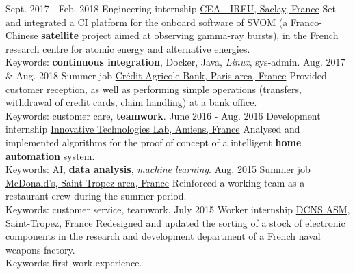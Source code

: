\documentclass[a4paper]{twentysecondcv} %
\begin{document}
\begin{twenty} %
    \twentyitem
    	{Sept. 2017 -}
		{Feb. 2018}
        {Engineering internship}
        {\href{http://irfu.cea.fr/}{CEA - IRFU, Saclay, France}}
        {}
        {Set and integrated a CI platform for the onboard software of SVOM (a Franco-Chinese \textbf{satellite} project aimed at observing gamma-ray bursts), in the French research centre for atomic energy and alternative energies.\\Keywords: \textbf{continuous integration}, Docker, Java, \textit{Linux}, sys-admin.}
    \twentyitem
        {Aug. 2017 \&}
                {Aug. 2018}
        {Summer job}
        {\href{https://ca-paris.com/}{Crédit Agricole Bank, Paris area, France}}
        {}
        {Provided customer reception, as well as performing simple operations (transfers, withdrawal of credit cards, claim handling) at a bank office.\\Keywords: customer care, \textbf{teamwork}.}
	\twentyitem
    	{June 2016 -}
		{Aug. 2016}
        {Development internship}
        {\href{http://lti-picardie.fr/}{Innovative Technologies Lab, Amiens, France}}
        {}
        {Analysed and implemented algorithms for the proof of concept of a intelligent \textbf{home automation} system.\\Keywords: AI, \textbf{data analysis}, \textit{machine learning}.}
    \twentyitem
   		{Aug. 2015}
        {}
        {Summer job}
        {\href{https://www.restaurants.mcdonalds.fr/mcdonalds-gassin}{McDonald's, Saint-Tropez area, France}}
        {}
        {Reinforced a working team as a restaurant crew during the summer period.\\Keywords: customer service, teamwork.}
     \twentyitem
   		{July 2015}
		{}
        {Worker internship}
        {\href{https://www.naval-group.com/fr/}{DCNS ASM, Saint-Tropez, France}}
        {}
        {Redesigned and updated the sorting of a stock of electronic components in the research and development department of a French naval weapons factory.\\Keywords: first work experience.}
\end{twenty}

\end{document}
